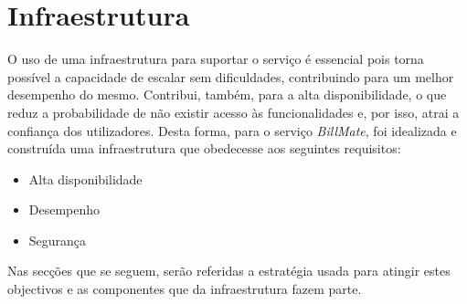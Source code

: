 \chapter[Infraestrutura]
{Infraestrutura}

O uso de uma infraestrutura para suportar o serviço é essencial pois torna possível a capacidade de escalar sem dificuldades, contribuindo para um melhor desempenho do mesmo. Contribui, também, para a alta disponibilidade, o que reduz a probabilidade de não existir acesso às funcionalidades e, por isso, atrai a confiança dos utilizadores. Desta forma, para o serviço \emph{BillMate}, foi idealizada e construída uma infraestrutura que obedecesse aos seguintes requisitos:

\begin{itemize}
	\item Alta disponibilidade
	\item Desempenho
	\item Segurança
\end{itemize}

Nas secções que se seguem, serão referidas a estratégia usada para atingir estes objectivos e as componentes que da infraestrutura fazem parte.



